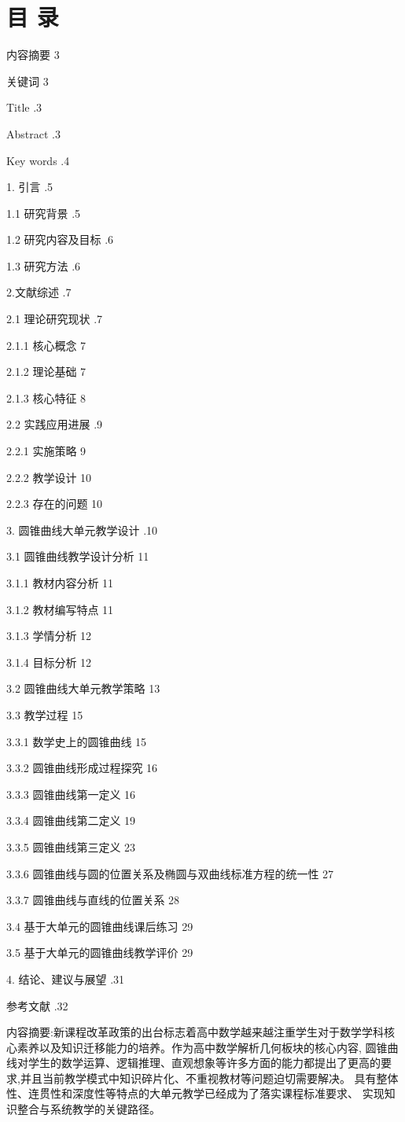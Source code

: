 \documentclass[10pt]{article}
\begin{document}
\section*{目 录}

内容摘要 3

关键词 3

Title .3

Abstract .3

Key words .4

1. 引言 .5

1.1 研究背景 .5

1.2 研究内容及目标 .6

1.3 研究方法 .6

2.文献综述 .7

2.1 理论研究现状 .7

2.1.1 核心概念 7

2.1.2 理论基础 7

2.1.3 核心特征 8

2.2 实践应用进展 .9

2.2.1 实施策略 9

2.2.2 教学设计 10

2.2.3 存在的问题 10

3. 圆锥曲线大单元教学设计 .10

3.1 圆锥曲线教学设计分析 11

3.1.1 教材内容分析 11

3.1.2 教材编写特点 11

3.1.3 学情分析 12

3.1.4 目标分析 12

3.2 圆锥曲线大单元教学策略 13

3.3 教学过程 15

3.3.1 数学史上的圆锥曲线 15

3.3.2 圆锥曲线形成过程探究 16

3.3.3 圆锥曲线第一定义 16

3.3.4 圆锥曲线第二定义 19

3.3.5 圆锥曲线第三定义 23

3.3.6 圆锥曲线与圆的位置关系及椭圆与双曲线标准方程的统一性 27

3.3.7 圆锥曲线与直线的位置关系 28

3.4 基于大单元的圆锥曲线课后练习 29

3.5 基于大单元的圆锥曲线教学评价 29

4. 结论、建议与展望 .31

参考文献 .32

内容摘要:新课程改革政策的出台标志着高中数学越来越注重学生对于数学学科核心素养以及知识迁移能力的培养。作为高中数学解析几何板块的核心内容, 圆锥曲线对学生的数学运算、逻辑推理、直观想象等许多方面的能力都提出了更高的要求,并且当前教学模式中知识碎片化、不重视教材等问题迫切需要解决。 具有整体性、连贯性和深度性等特点的大单元教学已经成为了落实课程标准要求、 实现知识整合与系统教学的关键路径。
\end{document}
